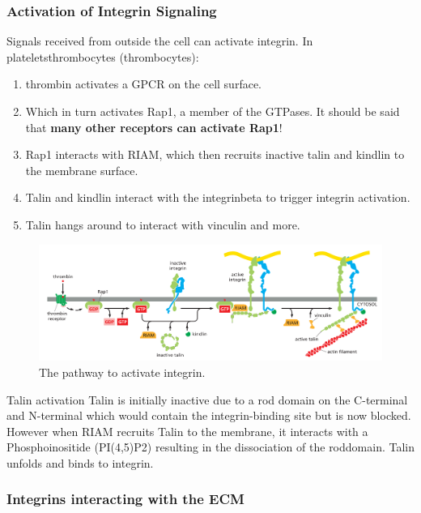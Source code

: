 \documentclass[../main.tex]{subfiles}
\begin{document}
\subsubsection{Activation of Integrin Signaling}
Signals received from outside the cell can activate integrin. In \gls{plateletsthrombocytes} (thrombocytes):
\begin{enumerate}
	\item \gls{thrombin} activates a GPCR on the cell surface.
	\item Which in turn activates \gls{Rap1}, a member of the GTPases. It should be said that \textbf{many other receptors can activate Rap1}!
	\item Rap1 interacts with \gls{RIAM}, which then recruits inactive talin and \gls{kindlin} to the membrane surface.
	\item Talin and kindlin interact with the \gls{integrinbeta} to trigger integrin activation.
	\item Talin hangs around to interact with vinculin and more.
\end{enumerate} 

\begin{figure}[H]
	\centering
	\includegraphics[width=0.9\linewidth]{int_path}
	\caption{The pathway to activate integrin.}
	\label{fig:intpath}
\end{figure}


\begin{RemarkWithTitel}{Talin activation}
	Talin is initially inactive due to a rod domain on the C-terminal and N-terminal which would contain the integrin-binding site but is now blocked. However when RIAM recruits Talin to the membrane, it interacts with a \gls{Phosphoinositide} (PI(4,5)P2) resulting in the dissociation of the \gls{roddomain}. Talin unfolds and binds to integrin.
\end{RemarkWithTitel}



\subsubsection{Integrins interacting with the ECM}
\end{document}
